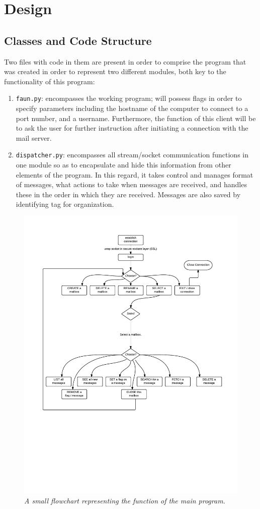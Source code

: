 \documentclass{article}
\newcommand{\enterSectionHeader}[1]{
\nobreak\extramarks{}{}\nobreak
\nobreak\extramarks{}{}\nobreak
}
\newcounter{docSectionCounter} %
\newcommand{\docSectionName}{}
\newenvironment{docSection}[1][Section \arabic{docSectionCounter}]{ %
\stepcounter{docSectionCounter} %
\renewcommand{\docSectionName}{#1} %
\section{\docSectionName} %
\enterSectionHeader{\docSectionName} %
}{
}
\newcommand{\docSubsectionName}{}
\newenvironment{docSubsection}[1]{ %
\renewcommand{\docSubsectionName}{#1} %
\subsection{\docSubsectionName} %
\enterSectionHeader{\docSubsectionName} %
}{
\enterSectionHeader{\docSectionName} %
}
\begin{document}
\begin{docSection}[Design]
\begin{docSubsection}{Classes and Code Structure}

Two files with code in them are present in order to comprise the program that was created in order to represent two different modules, both key to the functionality of this program:

\begin{enumerate}
    \item \texttt{faun.py}: encompasses the working program; will possess flags in order to specify parameters including the hostname of the computer to connect to a port number, and a username. Furthermore, the function of this client will be to ask the user for further instruction after initiating a connection with the mail server.
    \item \texttt{dispatcher.py}: encompasses all stream/socket communication functions in one module so as to encapsulate and hide this information from other elements of the program. In this regard, it takes control and manages format of messages, what actions to take when messages are received, and handles these in the order in which they are received. Messages are also saved by identifying tag for organization.
\end{enumerate}

\begin{figure}[h]
\centering\includegraphics[width=1.0\textwidth]{flowchart.pdf}
\caption{\textit{A small flowchart representing the function of the main program.}}
\end{figure}


\end{docSubsection}
\end{docSection}
\end{document}
